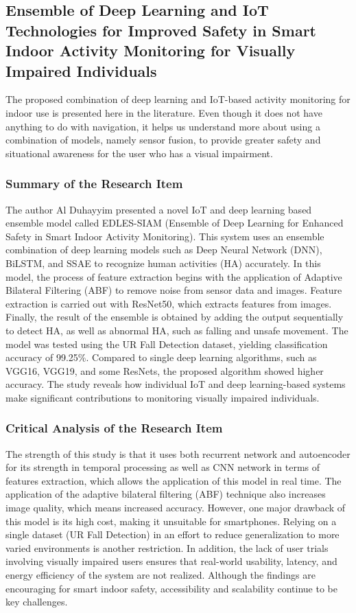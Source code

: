 \documentclass{FastFyp}
\begin{document}
\subsection{Ensemble of Deep Learning and IoT Technologies for Improved Safety in Smart Indoor Activity Monitoring for Visually Impaired Individuals}
The proposed combination of deep learning and IoT-based activity monitoring for indoor use is presented here in the literature. Even though it does not have anything to do with navigation, it helps us understand more about using a combination of models, namely sensor fusion, to provide greater safety and situational awareness for the user who has a visual impairment.

\subsubsection{Summary of the Research Item}
The author Al Duhayyim \cite{ref:al2025ensemble} presented a novel IoT and deep learning based ensemble model called EDLES-SIAM (Ensemble of Deep Learning for Enhanced Safety in Smart Indoor Activity Monitoring). This system uses an ensemble combination of deep learning models such as Deep Neural Network (DNN), BiLSTM, and SSAE to recognize human activities (HA) accurately. In this model, the process of feature extraction begins with the application of Adaptive Bilateral Filtering (ABF) to remove noise from sensor data and images. Feature extraction is carried out with ResNet50, which extracts features from images. Finally, the result of the ensemble is obtained by adding the output sequentially to detect HA, as well as abnormal HA, such as falling and unsafe movement. The model was tested using the UR Fall Detection dataset, yielding classification accuracy of 99.25\%. Compared to single deep learning algorithms, such as VGG16, VGG19, and some ResNets, the proposed algorithm showed higher accuracy. The study reveals how individual IoT and deep learning-based systems make significant contributions to monitoring visually impaired individuals.

\subsubsection{Critical Analysis of the Research Item}

The strength of this study is that it uses both recurrent network and autoencoder for its strength in temporal processing as well as CNN network in terms of features extraction, which allows the application of this model in real time. The application of the adaptive bilateral filtering (ABF) technique also increases image quality, which means increased accuracy. However, one major drawback of this model is its high cost, making it unsuitable for smartphones. Relying on a single dataset (UR Fall Detection) in an effort to reduce generalization to more varied environments is another restriction. In addition, the lack of user trials involving visually impaired users ensures that real-world usability, latency, and energy efficiency of the system are not realized. Although the findings are encouraging for smart indoor safety, accessibility and scalability continue to be key challenges. 
\end{document}
